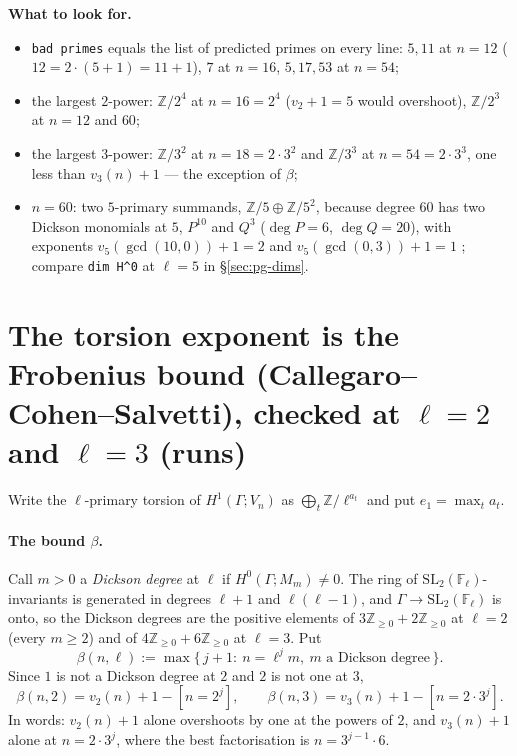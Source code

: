 \documentclass[11pt]{article}
\newcommand{\Z}{\mathbb{Z}}
\newcommand{\Fl}{\mathbb{F}_\ell}
\newcommand{\SL}{\mathrm{SL}}
\newcommand{\Ga}{\Gamma}
\newcommand{\code}[1]{\texttt{#1}}
\newenvironment{lookfor}{\par\noindent\textbf{What to look for.}\begin{itemize}[leftmargin=1.6em,itemsep=1pt]}{\end{itemize}}
\begin{document}
\begin{lookfor}
\item \code{bad primes} equals the list of predicted primes on every line: $5,11$ at $n=12$ ($12=2\cdot(5+1)=11+1$), $7$ at $n=16$, $5,17,53$ at $n=54$;
\item the largest $2$-power: $\Z/2^{4}$ at $n=16=2^{4}$ ($v_2+1=5$ would overshoot), $\Z/2^{3}$ at $n=12$ and $60$;
\item the largest $3$-power: $\Z/3^{2}$ at $n=18=2\cdot3^{2}$ and $\Z/3^{3}$ at $n=54=2\cdot3^{3}$, one less than $v_3(n)+1$ --- the exception of $\beta$;
\item $n=60$: two $5$-primary summands, $\Z/5\oplus\Z/5^{2}$, because degree $60$ has two Dickson monomials at $5$, $P^{10}$ and $Q^{3}$ ($\deg P=6$, $\deg Q=20$), with exponents
  $v_5(\gcd(10,0))+1=2$ and $v_5(\gcd(0,3))+1=1$ \cite[Thm.~4.5]{ph_ccs13}; compare \code{dim H\^{}0} at $\ell=5$ in \S\ref{sec:pg-dims}.
\end{lookfor}

\section{The torsion exponent is the Frobenius bound (Callegaro--Cohen--Salvetti), checked at \texorpdfstring{$\ell=2$}{l=2} and \texorpdfstring{$\ell=3$}{l=3} (runs)}\label{sec:pg-torsexp}

Write the $\ell$-primary torsion of $H^{1}(\Ga;V_n)$ as $\bigoplus_t\Z/\ell^{a_t}$ and put $e_1=\max_t a_t$.

\paragraph{The bound $\beta$.} Call $m>0$ a \emph{Dickson degree} at $\ell$ if $H^{0}(\Ga;M_m)\ne0$. The ring of
$\SL_2(\Fl)$-invariants is generated in degrees $\ell+1$ and $\ell(\ell-1)$, and $\Ga\to\SL_2(\Fl)$ is onto, so the Dickson degrees are the positive
elements of $3\Z_{\ge0}+2\Z_{\ge0}$ at $\ell=2$ (every $m\ge2$) and of $4\Z_{\ge0}+6\Z_{\ge0}$ at $\ell=3$. Put
\[
  \beta(n,\ell):=\max\{\,j+1:\ n=\ell^{j}m,\ m\text{ a Dickson degree}\,\}.
\]
Since $1$ is not a Dickson degree at $2$ and $2$ is not one at $3$,
\[
  \beta(n,2)=v_2(n)+1-[n=2^{j}],\qquad \beta(n,3)=v_3(n)+1-[n=2\cdot3^{j}] .
\]
In words: $v_2(n)+1$ alone overshoots by one at the powers of $2$, and $v_3(n)+1$ alone at $n=2\cdot3^{j}$, where the best factorisation is
$n=3^{j-1}\cdot6$.
\end{document}
